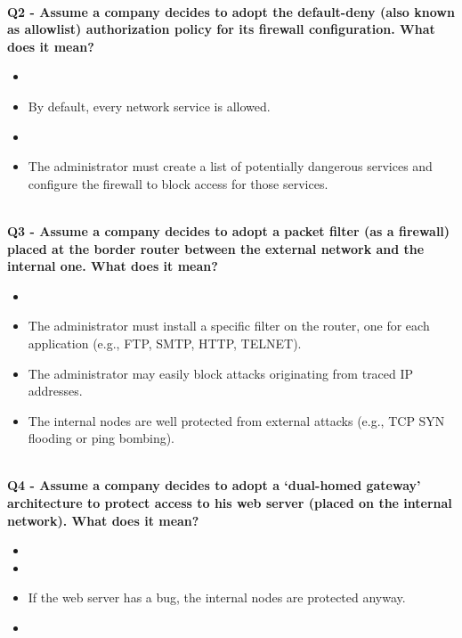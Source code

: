 \textbf{\\Q2 - Assume a company decides to adopt the default-deny (also known as allowlist) authorization policy for its firewall configuration. What does it mean?}
\begin{itemize}
	\item[A.] 
	\item[B.] By default, every network service is allowed.
	\item[C.] 
	\item[D.] The administrator must create a list of potentially dangerous services and configure the firewall to block access for those services.
\end{itemize}

\textbf{\\Q3 - Assume a company decides to adopt a packet filter (as a firewall) placed at the border router between the external network and the internal one. What does it mean?}
\begin{itemize}
	\item[A.] 
	\item[B.] The administrator must install a specific filter on the router, one for each application (e.g., FTP, SMTP, HTTP, TELNET).
	\item[C.] The administrator may easily block attacks originating from traced IP addresses.
	\item[D.] The internal nodes are well protected from external attacks (e.g., TCP SYN flooding or ping bombing).
\end{itemize}

\textbf{\\Q4 - Assume a company decides to adopt a ‘dual-homed gateway’ architecture to protect access to his web server (placed on the internal network). What does it mean?}
\begin{itemize}
	\item[A.] 
	\item[B.] 
	\item[C.] If the web server has a bug, the internal nodes are protected anyway.
	\item[D.] 
\end{itemize}
\com{}

